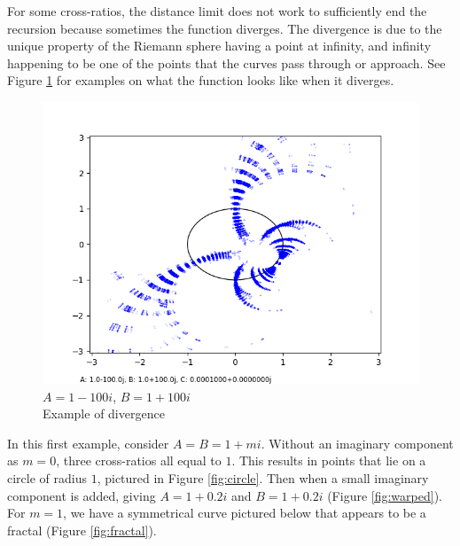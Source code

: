 \documentclass[12pt,a4paper,reqno,parskip=full]{amsart}
\numberwithin{equation}{section}
\theoremstyle{plain}
\theoremstyle{definition}
\begin{document}
For some cross-ratios, the distance limit does not work to sufficiently end the recursion because sometimes the function diverges. The divergence is due to the unique property of the Riemann sphere having a point at infinity, and infinity happening to be one of the points that the curves pass through or approach. See Figure \ref{fig:divergent cross-ratio} for examples on what the function looks like when it diverges. 

\begin{figure}[H]
    \centering
    \captionsetup{justification=centering}
    \includegraphics[width=0.5\linewidth]{nn/a-100 b100 h40 d0.025}
    \caption{$A=1-100i$, $B=1+100i$\\Example of divergence}
    \label{fig:divergent cross-ratio}
\end{figure}

In this first example, consider $A=B=1+mi$.
Without an imaginary component as $m=0$, three cross-ratios all equal to $1$. This results in points that lie on a circle of radius $1$, pictured in Figure \ref{fig:circle}. Then when a small imaginary component is added, giving $A=1+0.2i$ and $B=1+0.2i$ (Figure \ref{fig:warped}). For $m=1$, we have a symmetrical curve pictured below that appears to be a fractal (Figure \ref{fig:fractal}).
\end{document}
